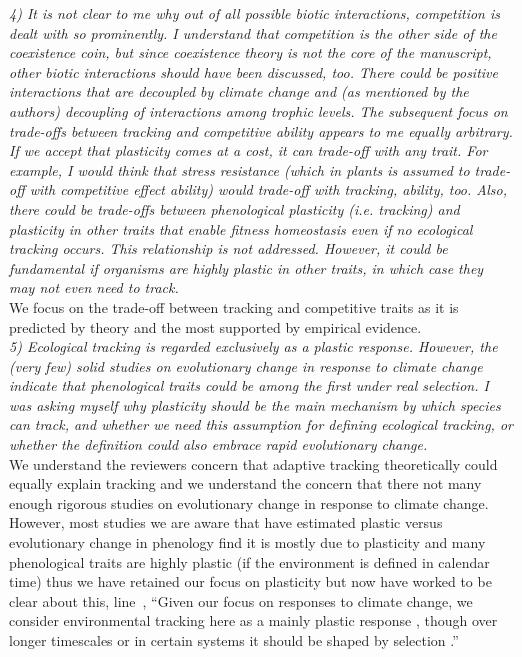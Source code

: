 \documentclass[11pt]{article}
\newcommand{\lr}[1]{line~\lineref{#1}}
\begin{document}
\emph{4) It is not clear to me why out of all possible biotic interactions, competition is dealt
with so prominently. I understand that competition is the other side of the coexistence coin,
but since coexistence theory is not the core of the manuscript, other biotic interactions
should have been discussed, too. There could be positive interactions that are decoupled by
climate change and (as mentioned by the authors) decoupling of interactions among trophic
levels.
The subsequent focus on trade-offs between tracking and competitive ability appears to me
equally arbitrary. If we accept that plasticity comes at a cost, it can trade-off with any
trait. For example, I would think that stress resistance (which in plants is assumed to
trade-off with competitive effect ability) would trade-off with tracking, ability, too. Also,
there could be trade-offs between phenological plasticity (i.e. tracking) and plasticity in
other traits that enable fitness homeostasis even if no ecological tracking occurs. This
relationship is not addressed. However, it could be fundamental if organisms are highly
plastic in other traits, in which case they may not even need to track.}\\

We focus on the trade-off between tracking and competitive traits as it is predicted by theory and the most supported by empirical evidence.\\

\emph{5) Ecological tracking is regarded exclusively as a plastic response. However, the (very few)
solid studies on evolutionary change in response to climate change indicate that phenological
traits could be among the first under real selection. I was asking myself why plasticity
should be the main mechanism by which species can track, and whether we need this assumption
for defining ecological tracking, or whether the definition could also embrace rapid
evolutionary change.}\\

We understand the reviewers concern that adaptive tracking \citep[\emph{sensu}][]{simons2011} theoretically could equally explain tracking and we understand the concern that there not many enough rigorous studies on evolutionary change in response to climate change. However, most studies we are aware that have estimated plastic versus evolutionary change in phenology find it is mostly due to plasticity and many phenological traits are highly plastic (if the environment is defined in calendar time) thus we have retained our focus on plasticity but now have worked to be clear about this, \lr{itsnotevo}, ``Given our focus on responses to climate change, we consider environmental tracking here as a mainly plastic response \citep{bonamour2019}, though over longer timescales or in certain systems it should be shaped by selection \citep{franks2012}.''\\
\end{document}
